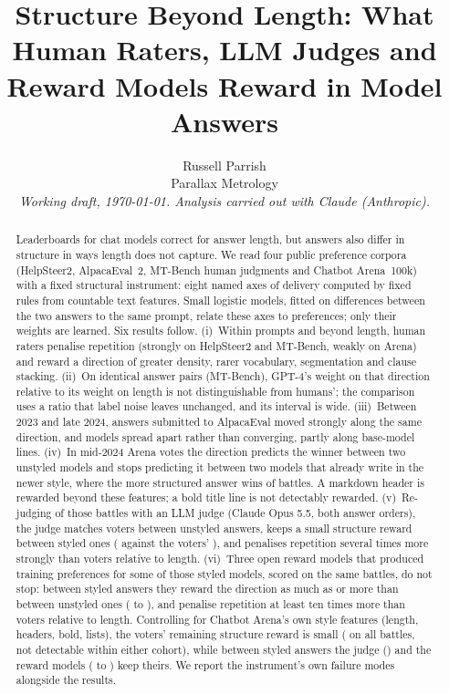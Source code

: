 \documentclass[11pt]{article}
\title{Structure Beyond Length: What Human Raters, LLM Judges and Reward Models Reward in Model Answers}
\author{Russell Parrish\\\small Parallax Metrology\\\small\textit{Working draft, \today. Analysis carried out with Claude (Anthropic).}}
\date{}
\begin{document}
\maketitle

\begin{abstract}
Leaderboards for chat models correct for answer length, but answers also differ in structure in ways length does not capture. We read four public preference corpora (HelpSteer2, AlpacaEval~2, MT-Bench human judgments and Chatbot Arena~100k) with a fixed structural instrument: eight named axes of delivery computed by fixed rules from countable text features. Small logistic models, fitted on differences between the two answers to the same prompt, relate these axes to preferences; only their weights are learned. Six results follow. (i)~Within prompts and beyond length, human raters penalise repetition (strongly on HelpSteer2 and MT-Bench, weakly on Arena) and reward a direction of greater density, rarer vocabulary, segmentation and clause stacking. (ii)~On identical answer pairs (MT-Bench), GPT-4's weight on that direction relative to its weight on length is not distinguishable from humans'; the comparison uses a ratio that label noise leaves unchanged, and its interval is wide. (iii)~Between 2023 and late 2024, answers submitted to AlpacaEval moved strongly along the same direction, and models spread apart rather than converging, partly along base-model lines. (iv)~In mid-2024 Arena votes the direction predicts the winner between two unstyled models and stops predicting it between two models that already write in the newer style, where the more structured answer wins \arBothHigherWins{} of battles. A markdown header is rewarded beyond these features; a bold title line is not detectably rewarded. (v)~Re-judging \jBattles{} of those battles with an LLM judge (Claude Opus 5.5, both answer orders), the judge matches voters between unstyled answers, keeps a small structure reward between styled ones (\jBStruct{} against the voters' \jBHStruct), and penalises repetition several times more strongly than voters relative to length. (vi)~Three open reward models that produced training preferences for some of those styled models, scored on the same battles, do not stop: between styled answers they reward the direction as much as or more than between unstyled ones (\rmPairB{} to \rmGpmB), and penalise repetition at least ten times more than voters relative to length. Controlling for Chatbot Arena's own style features (length, headers, bold, lists), the voters' remaining structure reward is small (\sbVAll{} on all battles, not detectable within either cohort), while between styled answers the judge (\sbJB) and the reward models (\sbGB{} to \sbAB) keep theirs. We report the instrument's own failure modes alongside the results.
\end{abstract}
\end{document}
